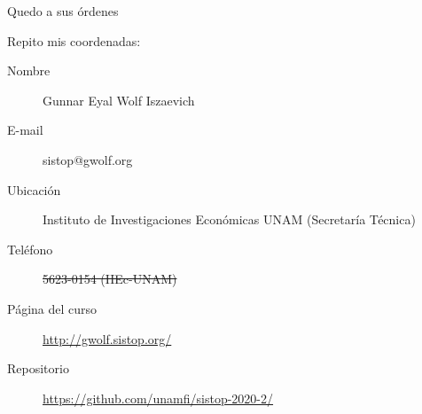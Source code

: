 \documentclass[presentation]{beamer}
\begin{document}
\begin{frame}[label={sec:org92c9816}]{Quedo a sus órdenes}
\begin{center}
Repito mis coordenadas:
\end{center}
\begin{description}
\item[{Nombre}] Gunnar Eyal Wolf Iszaevich
\item[{E-mail}] sistop@gwolf.org
\item[{Ubicación}] Instituto de Investigaciones Económicas UNAM
(Secretaría Técnica)
\item[{Teléfono}] \sout{5623-0154 (IIEc-UNAM)}
\item[{Página del curso}] \url{http://gwolf.sistop.org/}
\item[{Repositorio}] \small \url{https://github.com/unamfi/sistop-2020-2/}
\end{description}
\end{frame}
\end{document}
